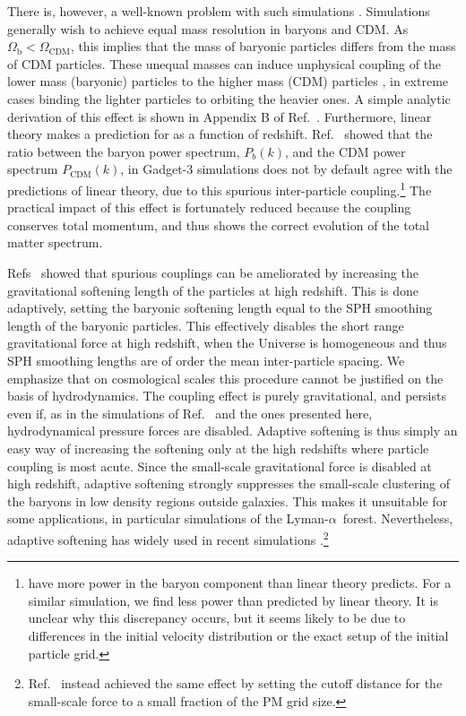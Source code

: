 \documentclass[a4paper,11pt]{article}
\newcommand{\Lya}{Lyman-$\alpha$}
\begin{document}
There is, however, a well-known problem with such simulations \cite{OLeary:2012, Angulo:2013}. Simulations generally wish to achieve equal mass resolution in baryons and CDM. As $\Omega_\mathrm{b} < \Omega_\mathrm{CDM}$, this implies that the mass of baryonic particles differs from the mass of CDM particles. These unequal masses can induce unphysical coupling of the lower mass (baryonic) particles to the higher mass (CDM) particles \cite{OLeary:2012}, in extreme cases binding the lighter particles to orbiting the heavier ones. A simple analytic derivation of this effect is shown in Appendix B of Ref.~\cite{OLeary:2012}. Furthermore, linear theory makes a prediction for  as a function of redshift. Ref.~\cite{Angulo:2013} showed that the ratio between the baryon power spectrum, $P_b(k)$, and the CDM power spectrum $P_\mathrm{CDM}(k)$, in Gadget-3 \cite{Springel:2005} simulations does not by default agree with the predictions of linear theory, due to this spurious inter-particle coupling.\footnote{\cite{Angulo:2013} have more power in the baryon component than linear theory predicts. For a similar simulation, we find less power than predicted by linear theory. It is unclear why this discrepancy occurs, but it seems likely to be due to differences in the initial velocity distribution or the exact setup of the initial particle grid.} The practical impact of this effect is fortunately reduced because the coupling conserves total momentum, and thus shows the correct evolution of the total matter spectrum.

Refs~\cite{OLeary:2012, Angulo:2013} showed that spurious couplings can be ameliorated by increasing the gravitational softening length of the particles at high redshift. This is done adaptively, setting the baryonic softening length equal to the SPH smoothing length of the baryonic particles. This effectively disables the short range gravitational force at high redshift, when the Universe is homogeneous and thus SPH smoothing lengths are of order the mean inter-particle spacing. We emphasize that on cosmological scales this procedure cannot be justified on the basis of hydrodynamics. The coupling effect is purely gravitational, and persists even if, as in the simulations of Ref.~\cite{Angulo:2013} and the ones presented here, hydrodynamical pressure forces are disabled. Adaptive softening is thus simply an easy way of increasing the softening only at the high redshifts where particle coupling is most acute. Since the small-scale gravitational force is disabled at high redshift, adaptive softening strongly suppresses the small-scale clustering of the baryons in low density regions outside galaxies. This makes it unsuitable for some applications, in particular simulations of the \Lya~forest. Nevertheless, adaptive softening has widely used in recent simulations \cite[e.g][]{Paco:2018}.\footnote{Ref.~\cite{Valkenburg:2017} instead achieved the same effect by setting the cutoff distance for the small-scale force to a small fraction of the PM grid size.}
\end{document}
